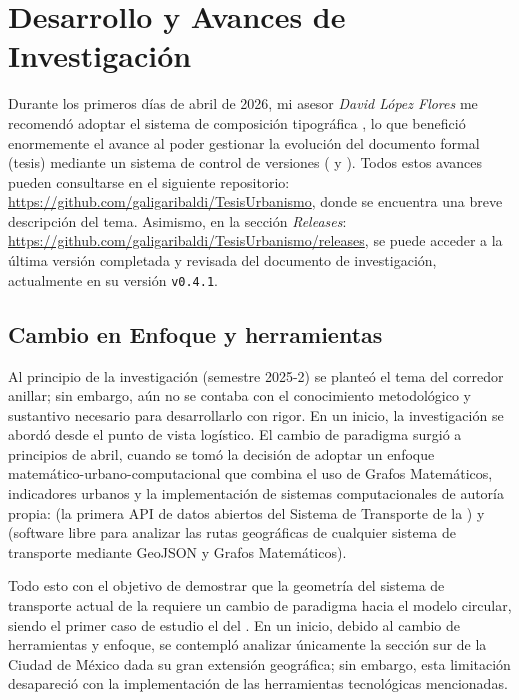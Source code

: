 
\section{Desarrollo y Avances de Investigación}
\label{sec:desarrollo-conceptual}

Durante los primeros días de abril de 2026, mi asesor \textit{David López Flores}
me recomendó adoptar el sistema de composición tipográfica ,
lo que benefició enormemente el avance al poder gestionar la evolución del documento formal
(tesis) mediante un sistema de control de versiones ( y ).
Todos estos avances pueden consultarse en el siguiente repositorio:
\url{https://github.com/galigaribaldi/TesisUrbanismo}, donde se encuentra una breve
descripción del tema. Asimismo, en la sección \textit{Releases}:
\url{https://github.com/galigaribaldi/TesisUrbanismo/releases}, se puede acceder
a la última versión completada y revisada del documento de investigación, actualmente
en su versión \texttt{v0.4.1}.


\subsection{Cambio en Enfoque y herramientas}
\label{ssec:cambio-enfoque}

Al principio de la investigación (semestre 2025-2) se planteó el tema del corredor anillar;
sin embargo, aún no se contaba con el conocimiento metodológico y sustantivo necesario
para desarrollarlo con rigor. En un inicio, la investigación se abordó desde el punto
de vista logístico. El cambio de paradigma surgió a principios de abril, cuando se tomó
la decisión de adoptar un enfoque matemático-urbano-computacional que combina el uso de
Grafos Matemáticos, indicadores urbanos y la implementación de sistemas computacionales
de autoría propia:  (la primera API de datos abiertos del Sistema de
Transporte de la \zmvm) y  (software libre para analizar las rutas
geográficas de cualquier sistema de transporte mediante GeoJSON y Grafos Matemáticos).

Todo esto con el objetivo de demostrar que la geometría del sistema de transporte
actual de la \zmvm requiere un cambio de paradigma hacia el modelo circular, siendo el
primer caso de estudio el del .
En un inicio, debido al cambio de herramientas y enfoque, se contempló analizar únicamente
la sección sur de la Ciudad de México dada su gran extensión geográfica; sin embargo, esta
limitación desapareció con la implementación de las herramientas tecnológicas mencionadas.


